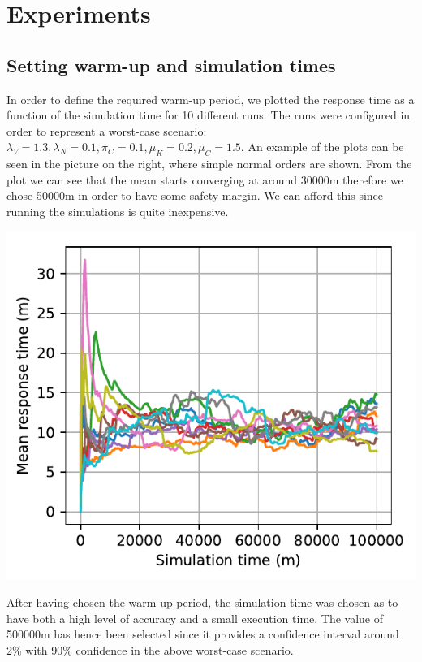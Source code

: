\section{Experiments}

\subsection{Setting warm-up and simulation times}

\begin{minipage}{.6\textwidth}
  In order to define the required warm-up period, we plotted the response time as a function of the simulation time for 10 different runs. The runs were configured in order to represent a worst-case scenario: $\lambda_V=1.3, \lambda_N=0.1,\pi_C=0.1,\mu_K=0.2,\mu_C=1.5$. An example of the plots can be seen in the picture on the right, where simple normal orders are shown. From the plot we can see that the mean starts converging at around 30000m therefore we chose 50000m in order to have some safety margin. We can afford this since running the simulations is quite inexpensive.
\end{minipage}
\begin{minipage}{.4\textwidth}
  \centering
  \includegraphics[width=\textwidth]{figs/warmup_definition.pdf}
  \label{fig:warmup}
\end{minipage}

After having chosen the warm-up period, the simulation time was chosen as to have both a high level of accuracy and a small execution time. The value of 500000m has hence been selected since it provides a confidence interval around 2\% with 90\% confidence in the above worst-case scenario.

